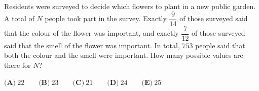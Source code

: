 Residents were surveyed to decide which flowers to plant in a new public garden. A total of $N$ people took part in the survey. Exactly $\dfrac{9}{14}$ of those surveyed said that the colour of the flower was important, and exactly $\dfrac{7}{12}$ of those surveyed said that the smell of the flower was important. In total, $753$ people said that both the colour and the smell were important. How many possible values are there for $N$?

$\textbf{(A)}\ 22\qquad\textbf{(B)}\ 23\qquad\textbf{(C)}\ 21\qquad\textbf{(D)}\ 24\qquad\textbf{(E)}\ 25$
